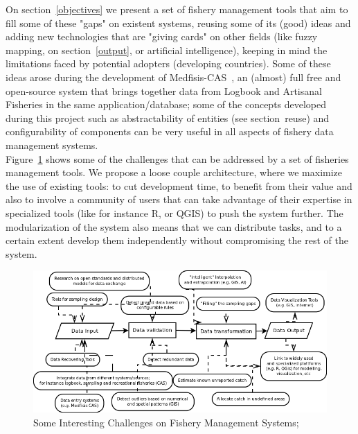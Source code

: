 \documentclass[11pt]{article} %
\begin{document}
On section~\ref{objectives} we present a set of fishery management tools that aim to fill some of these "gaps" on existent systems, reusing some of its (good) ideas and adding new technologies that are "giving cards" on other fields (like fuzzy mapping, on section~\ref{output}, or artificial intelligence), keeping in mind the limitations faced by potential adopters (developing countries). Some of these ideas arose during the development of Medfisis-CAS~\cite{medfisis}, an (almost) full free and open-source system that brings together data from Logbook and Artisanal Fisheries in the same application/database; some of the concepts developed during this project such as abstractability of entities (see section~{reuse}) and configurability of components can be very useful in all aspects of fishery data management systems.\\
Figure~\ref{challenges} shows some of the challenges that can be addressed by a set of fisheries management tools. We propose a loose couple architecture, where we maximize the use of existing tools: to cut development time, to benefit from their value and also to involve a community of users that can take advantage of their expertise in specialized tools (like for instance R, or QGIS) to push the system further. The modularization of the system also means that we can distribute tasks, and to a certain extent develop them independently without compromising the rest of the system.\\


  \begin{figure}[!ht]%
    \begin{center} 
	\includegraphics[width=\textwidth ]{challenges_cas}
      \caption[Some Interesting Challenges on Fishery Management Systems;]{Some Interesting Challenges on Fishery Management Systems;}
      \label{challenges} %
    \end{center} 
  \end{figure}
\end{document}
